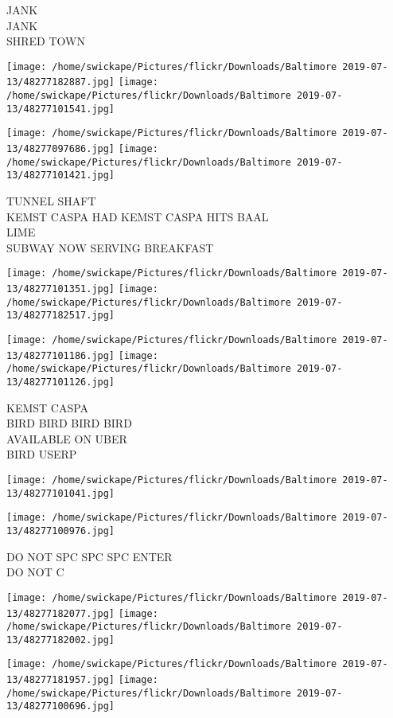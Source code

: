 \documentclass[10pt,letterpaper]{article}
\begin{document}
JANK\\
JANK\\
SHRED TOWN
\pagebreak

\texttt{[image: /home/swickape/Pictures/flickr/Downloads/Baltimore 2019-07-13/48277182887.jpg]}
\texttt{[image: /home/swickape/Pictures/flickr/Downloads/Baltimore 2019-07-13/48277101541.jpg]}

\texttt{[image: /home/swickape/Pictures/flickr/Downloads/Baltimore 2019-07-13/48277097686.jpg]}
\texttt{[image: /home/swickape/Pictures/flickr/Downloads/Baltimore 2019-07-13/48277101421.jpg]}

TUNNEL SHAFT\\
KEMST CASPA HAD KEMST CASPA HITS BAAL\\
LIME\\
SUBWAY NOW SERVING BREAKFAST
\pagebreak

\texttt{[image: /home/swickape/Pictures/flickr/Downloads/Baltimore 2019-07-13/48277101351.jpg]}
\texttt{[image: /home/swickape/Pictures/flickr/Downloads/Baltimore 2019-07-13/48277182517.jpg]}

\texttt{[image: /home/swickape/Pictures/flickr/Downloads/Baltimore 2019-07-13/48277101186.jpg]}
\texttt{[image: /home/swickape/Pictures/flickr/Downloads/Baltimore 2019-07-13/48277101126.jpg]}

KEMST CASPA\\
BIRD BIRD BIRD BIRD\\
AVAILABLE ON UBER\\
BIRD USERP
\pagebreak

\texttt{[image: /home/swickape/Pictures/flickr/Downloads/Baltimore 2019-07-13/48277101041.jpg]}

\vspace{0.25in}
\texttt{[image: /home/swickape/Pictures/flickr/Downloads/Baltimore 2019-07-13/48277100976.jpg]}

DO NOT SPC SPC SPC ENTER\\
DO NOT C
\pagebreak

\texttt{[image: /home/swickape/Pictures/flickr/Downloads/Baltimore 2019-07-13/48277182077.jpg]}
\texttt{[image: /home/swickape/Pictures/flickr/Downloads/Baltimore 2019-07-13/48277182002.jpg]}

\texttt{[image: /home/swickape/Pictures/flickr/Downloads/Baltimore 2019-07-13/48277181957.jpg]}
\texttt{[image: /home/swickape/Pictures/flickr/Downloads/Baltimore 2019-07-13/48277100696.jpg]}
\end{document}
